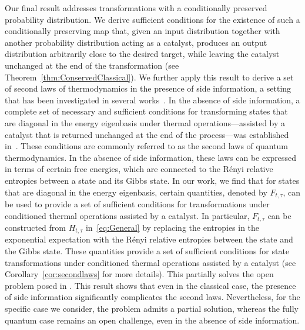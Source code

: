 \documentclass[aps,pra,11pt,onecolumn,nofootinbib,tightenlines]{revtex4-2}
\theoremstyle{definition}
\begin{document}
Our final result addresses transformations with a conditionally preserved probability distribution. We derive sufficient conditions for the existence of such a conditionally preserving map that, given an input distribution together with another probability distribution acting as a catalyst, produces an output distribution arbitrarily close to the desired target, while leaving the catalyst unchanged at the end of the transformation (see Theorem~\ref{thm:ConservedClassical}).
We further apply this result to derive a set of second laws of thermodynamics in the presence of side information, a setting that has been investigated in several works~\cite{sagawa2008second,morris2019assisted,rio2011thermodynamic,bera2017generalized,ji2025fundamental,narasimhachar2017resource}.
In the absence of side information, a complete set of necessary and sufficient conditions for transforming states that are diagonal in the energy eigenbasis under thermal operations—assisted by a catalyst that is returned unchanged at the end of the process—was established in~\cite{Brandao}.
 These conditions are commonly referred to as the second laws of quantum thermodynamics. In the absence of side information, these laws can be expressed in terms of certain free energies, which are connected to the Rényi relative entropies between a state and its Gibbs state. 
 In our work, we find that for states that are diagonal in the energy eigenbasis, certain quantities, denoted by $F_{t,\tau}$,  can be used to provide a set of sufficient conditions for transformations under conditioned thermal operations assisted by a catalyst. In particular, 
 \(F_{t,\tau}\) can be constructed from \(H_{t,\tau}\) in~\eqref{eq:General} by replacing the entropies in the exponential expectation with the R\'enyi relative entropies between the state and the Gibbs state. These quantities provide a set of sufficient conditions for state transformations under conditioned thermal operations assisted by a catalyst (see Corollary~\ref{cor:secondlaws} for more details).
This partially solves the open problem posed in \cite[Section V.B]{ji2025fundamental}.
This result shows that even in the classical case, the presence of side information significantly complicates the second laws. Nevertheless, for the specific case we consider, the problem admits a partial solution, whereas the fully quantum case remains an open challenge, even in the absence of side information.
\end{document}
